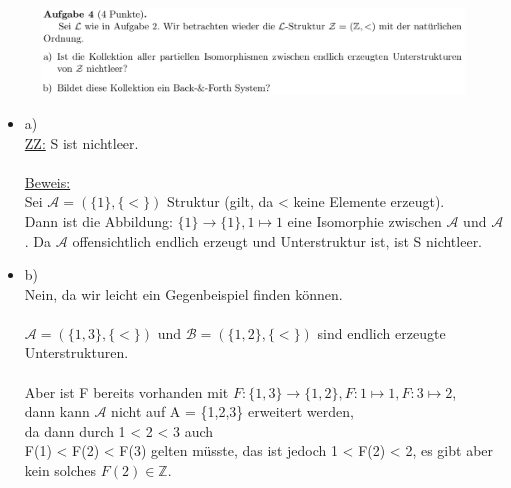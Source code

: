 \documentclass[a4paper]{scrartcl}
\begin{document}
    \begin{figure}[H]
        \centering
        \includegraphics[scale=0.3]{./A-4.png}
        \label{fig:}
    \end{figure}

    \begin{itemize}
        \item a)\\
            \underline{ZZ:} S ist nichtleer.\\
            \\\underline{Beweis:}\\ 
            Sei $\mathcal{A} = (\{1\}, \{<\})$ Struktur (gilt, da < keine Elemente erzeugt).\\
            Dann ist die Abbildung: $\{1\} \rightarrow \{1\}, 1 \mapsto 1$ eine Isomorphie zwischen $\mathcal{A} \text{ und } \mathcal{A}$.
            Da $\mathcal{A}$ offensichtlich endlich erzeugt und Unterstruktur ist, ist S nichtleer.\\

        \item b)\\
            Nein, da wir leicht ein Gegenbeispiel finden können.\\
            \\$\mathcal{A} = (\{1,3\}, \{<\}) \text{ und } \mathcal{B} = (\{1,2\}, \{<\})$ sind endlich erzeugte Unterstrukturen.\\
            \\Aber ist F bereits vorhanden mit $F: \{1,3\} \rightarrow \{1,2\}, F: 1 \mapsto 1, F: 3 \mapsto 2$,\\
            dann kann $\mathcal{A}$ nicht auf A = \{1,2,3\} erweitert werden,\\
            da dann durch 1 < 2 < 3 auch\\
            F(1) < F(2) < F(3) gelten müsste, das ist jedoch 1 < F(2) < 2, es gibt aber kein solches $F(2) \in \mathds{Z}$.\\

    \end{itemize}%
\end{document}
